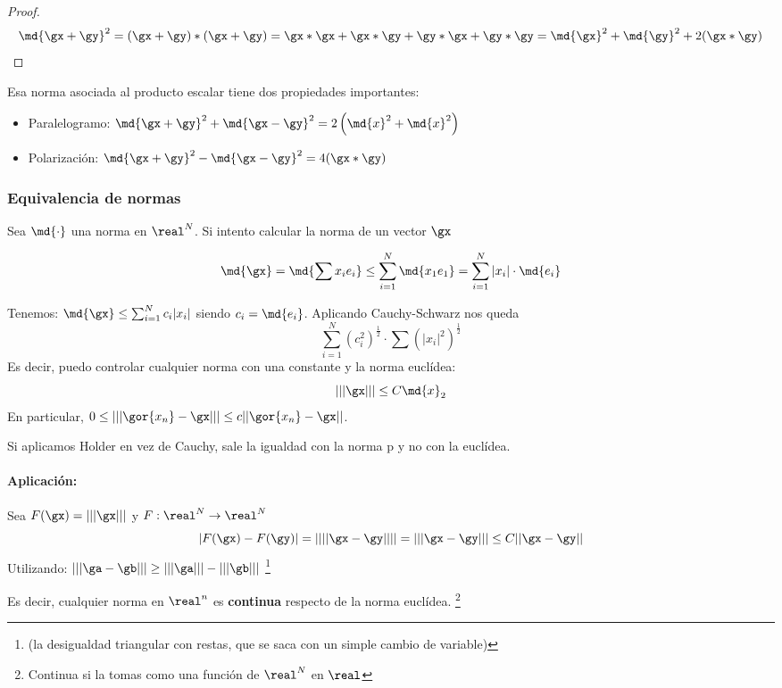 \documentclass{apuntes}
\begin{document}
\begin{proof}
\[ \md{\gx+\gy}^2 = (\gx+\gy)\ast(\gx+\gy) = \gx \ast \gx + \gx \ast \gy + \gy \ast \gx + \gy \ast \gy=\md{\gx} ^ 2 + \md{\gy} ^ 2+2(\gx\ast\gy) \]
\end{proof}

Esa norma asociada al producto escalar tiene dos propiedades importantes:
\begin{itemize}
\item Paralelogramo: $\md{\gx+\gy}^ 2 + \md{\gx-\gy} ^ 2 = 2\left(\md{x}^2+\md{x}^2\right) $
\item Polarización: $\md{\gx+\gy} ^ 2 - \md{\gx-\gy} ^ 2 = 4(\gx*\gy)$
\end{itemize}


\subsubsection{Equivalencia de normas}
Sea $\md{\cdot}$ una norma en $\real^N$. Si intento calcular la norma de un vector $\gx$

\[ \md{\gx} = \md{\sum x_i e_i} \leq \sum_{i=1}^N \md{x_1 e_1} = \sum_{i=1}^N|x_i|\cdot\md{e_i} \]

Tenemos: $\md{\gx} \leq \sum_{i=1}^N c_i |x_i|$ siendo $c_i = \md{e_i}$. Aplicando Cauchy-Schwarz  nos queda
\[ \sum_{i=1}^N \left(c_i^2\right)^\frac{1}{2} \cdot \sum \left(|x_i|^2\right)^\frac{1}{2} \]
Es decir, puedo controlar cualquier norma con una constante y la norma euclídea:
$$|||\gx||| \leq C \md{x}_{2}$$
En particular, $0 \leq |||\gor{x_n} - \gx|||\leq c ||\gor{x_n}-\gx||$. 

\begin{remark}
Si aplicamos Holder en vez de Cauchy, sale la igualdad con la norma p y no con la euclídea.
\end{remark}

\paragraph{Aplicación:}
Sea $F(\gx) = |||\gx|||$ y $F:\real^N \rightarrow \real^N$ 
$$|F(\gx)-F(\gy)| = \left| |||\gx - \gy||| \right| = |||\gx - \gy||| \leq C ||\gx - \gy||$$
Utilizando: $|||\ga-\gb||| \ge |||\ga||| - |||\gb|||$ \footnote{(la desigualdad triangular con restas, que se saca con un simple cambio de variable)}

Es decir, cualquier norma en $\real^n$ es \textbf{continua} respecto de la norma euclídea. \footnote{Continua si la tomas como una función de $\real^N$ en $\real$}
\end{document}
